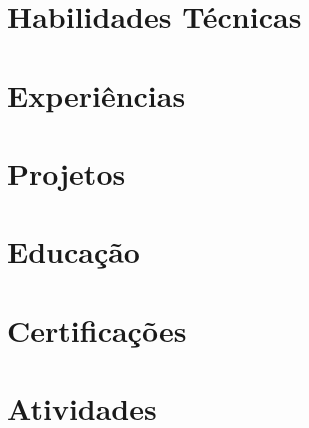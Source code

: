 \documentclass[10pt]{article}
\begin{document}
\pagestyle{others}\thispagestyle{first_page}



\section{Habilidades Técnicas}


\section{Experiências}


\newpage
\section{Projetos}


\section{Educação}


\section{Certificações}


\section{Atividades}

\end{document}
